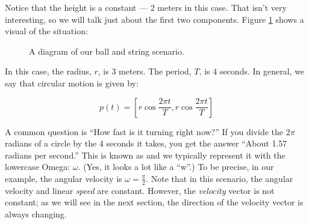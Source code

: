 Notice that the height is a constant --- 2 meters in this
case. That isn't very interesting, so we will talk just about the
first two components. Figure \ref{fig:billiardBall} shows a visual of the situation:


\begin{figure}[H]
  \begin{center}
  \end{center}
  \caption{A diagram of our ball and string scenario.}
  \label{fig:billiardBall}
\end{figure}

In this case, the radius, $r$, is 3 meters. The period, $T$, is 4
seconds. In general, we say that circular motion is given by:

$$p(t) = \left[ r \cos{\frac{2 \pi t}{T}}, r \cos{\frac{2 \pi t}{T}}\right]$$

A common question is ``How fast is it turning right now?''  If you
divide the $2\pi$ radians of a circle by the 4 seconds it takes, you
get the answer ``About 1.57 radians per second.''  This is known as
 and we typically represent it with the
lowercase Omega: $\omega$. (Yes, it looks a lot like a ``w''.)  To be
precise, in our example, the angular velocity is $\omega = \frac{\pi}{2}$. Note that in this scenario, the angular velocity and linear \emph{speed} are constant. However, the \emph{velocity} vector is not constant; as we will see in the next section, the direction of the velocity vector is always changing.

